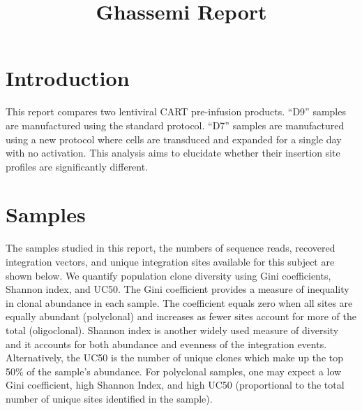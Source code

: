 \documentclass[]{article}
\title{Ghassemi Report }
\author{}
\date{}
\begin{document}
	
%    


{%
\setlength{\parindent}{0pt}
\thispagestyle{plain}
{\fontsize{18}{20}\selectfont\raggedright 
\maketitle  %

}

{
   \vskip 13.5pt\relax \normalsize\fontsize{11}{12} 
 

}

}






\vskip 6.5pt


\noindent  \hypertarget{introduction}{%
\section{Introduction}\label{introduction}}

This report compares two lentiviral CART pre-infusion products. ``D9''
samples are manufactured using the standard protocol. ``D7'' samples are
manufactured using a new protocol where cells are transduced and
expanded for a single day with no activation. This analysis aims to
elucidate whether their insertion site profiles are significantly
different.

\hypertarget{samples}{%
\section{Samples}\label{samples}}

The samples studied in this report, the numbers of sequence reads,
recovered integration vectors, and unique integration sites available
for this subject are shown below. We quantify population clone diversity
using Gini coefficients, Shannon index, and UC50. The Gini coefficient
provides a measure of inequality in clonal abundance in each sample. The
coefficient equals zero when all sites are equally abundant (polyclonal)
and increases as fewer sites account for more of the total
(oligoclonal). Shannon index is another widely used measure of diversity
and it accounts for both abundance and evenness of the integration
events. Alternatively, the UC50 is the number of unique clones which
make up the top 50\% of the sample's abundance. For polyclonal samples,
one may expect a low Gini coefficient, high Shannon Index, and high UC50
(proportional to the total number of unique sites identified in the
sample).
\end{document}
